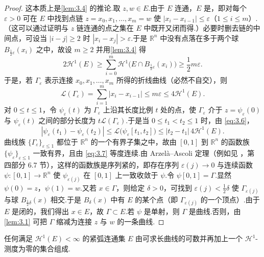 \begin{proof}
这本质上是\cref{lem:3.4} 的推论.取 $z,w\in E$.由于 $E$ 连通，$E$ 是，即对每个 $\varepsilon>0$ 可在 $E$ 中找到点链 $z=x_0,x_1,\ldots,x_m=w$ 使 $|x_i-x_{i-1}|\leq\varepsilon$（$1\leq i\leq m$）.（这可以通过证明与 $z$ 链连通的点之集在 $E$ 中既开又闭而得.）必要时删去链的中间点，可设当 $|i-j|\geq 2$ 时 $|x_i-x_j|>\varepsilon$.于是 $\mathbb{R}^n$ 中没有点落在多于两个球 $B_{\frac{1}{2}\varepsilon}(x_i)$ 之中，故设 $m\geq 2$ 并用\cref{lem:3.4} 得
\[
  2\mathcal{H}^{1}(E)\geq\sum_{i=0}^{m}\mathcal{H}^{1}\bigl(E\cap B_{\frac{1}{2}\varepsilon}(x_i)\bigr)\geq\frac{1}{2}m\varepsilon.
\]
于是，若 $\Gamma_\varepsilon$ 表示连接 $x_0,x_1,\ldots,x_m$ 所得的折线曲线（必然不自交），则
\begin{equation}\label{eq:3.6}
  \mathscr{L}(\Gamma_{\varepsilon})=\sum_{i=1}^{m}|x_i-x_{i-1}|\leq m\varepsilon\leq 4\mathcal{H}^{1}(E).
\end{equation}
对 $0\leq t\leq 1$，令 $\psi_\varepsilon(t)$ 为 $\Gamma_\varepsilon$ 上沿其长度比例 $t$ 处的点，使 $\Gamma_\varepsilon$ 介于 $z=\psi_\varepsilon(0)$ 与 $\psi_\varepsilon(t)$ 之间的部分长度为 $t\mathscr{L}(\Gamma_\varepsilon)$.于是当 $0\leq t_1<t_2\leq 1$ 时，由 \eqref{eq:3.6}，
\begin{equation}\label{eq:3.7}
  |\psi_{\varepsilon}(t_1)-\psi_{\varepsilon}(t_2)|\leq\mathscr{L}\bigl(\psi_{\varepsilon}[t_1,t_2]\bigr)\leq|t_2-t_1|\,4\mathcal{H}^{1}(E).
\end{equation}
曲线族 $\{\Gamma_\varepsilon\}_{\varepsilon\leq 1}$ 都位于 $\mathbb{R}^n$ 的一个有界子集之中，故由 $[0,1]$ 到 $\mathbb{R}^n$ 的函数族 $\{\psi_\varepsilon\}_{\varepsilon\leq 1}$ 一致有界，且由 \eqref{eq:3.7} 等度连续.由 Arzelà--Ascoli 定理（例如见 \textcite{dunfordschwartz1958}，第四部分 6.7 节），这样的函数族是序列紧的，即存在序列 $\varepsilon(j)\to 0$ 与连续函数 $\psi:[0,1]\to\mathbb{R}^n$ 使 $\psi_{\varepsilon(j)}$ 在 $[0,1]$ 上一致收敛于 $\psi$.令 $\psi[0,1]=\Gamma$.显然 $\psi(0)=z$，$\psi(1)=w$.又若 $x\in\Gamma$，则给定 $\delta>0$，可找到 $\varepsilon(j)<\frac{1}{2}\delta$ 使 $\Gamma_{\varepsilon(j)}$ 与球 $B_{\frac{1}{2}\delta}(x)$ 相交.于是 $B_\delta(x)$ 中有 $E$ 的某个点（即 $\Gamma_{\varepsilon(j)}$ 的一个顶点）.由于 $E$ 是闭的，我们得出 $x\in E$，故 $\Gamma\subset E$.若 $\psi$ 是单射，则 $\Gamma$ 是曲线.否则，由\cref{lem:3.1} 可把 $\Gamma$ 缩减为连接 $z$ 与 $w$ 的一条曲线.
\end{proof}

\begin{lemma}\label{lem:3.13}
任何满足 $\mathcal{H}^1(E)<\infty$ 的紧弧连通集 $E$ 由可求长曲线的可数并再加上一个 $\mathcal{H}^1$-测度为零的集合组成.
\end{lemma}

